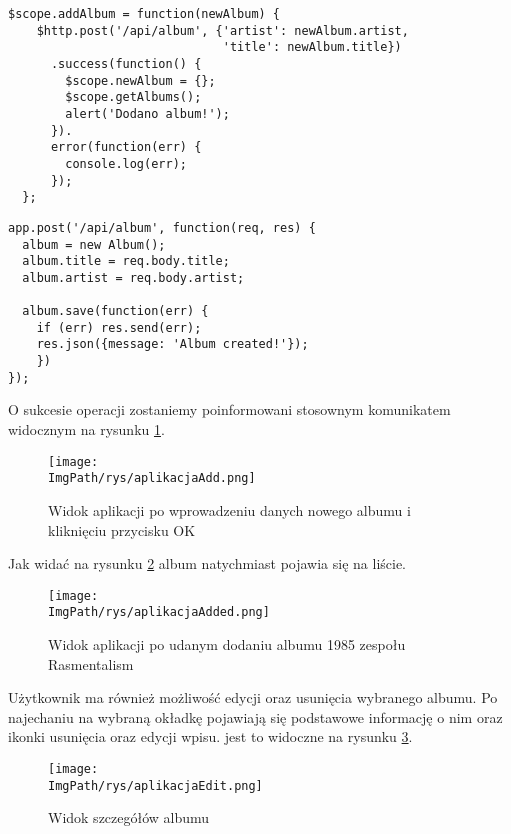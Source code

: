 \documentclass[a4paper,12pt,twoside,openany]{report}
\newcommand{\ImgPath}{.}
\begin{document}
\begin{lstlisting}[caption=Kod odpowiedzialny za wysłanie zapytania do serwera z prośbą o dodanie albumu, label=add1]
  $scope.addAlbum = function(newAlbum) {
    $http.post('/api/album', {'artist': newAlbum.artist,
                              'title': newAlbum.title})
      .success(function() {
        $scope.newAlbum = {};
        $scope.getAlbums();
        alert('Dodano album!');
      }).
      error(function(err) {
        console.log(err);
      });
  };
\end{lstlisting}


\begin{lstlisting}[caption=Kod odpowiedzialny za dodanie albumu do bazy, label=add2]
app.post('/api/album', function(req, res) {
  album = new Album();
  album.title = req.body.title;
  album.artist = req.body.artist;

  album.save(function(err) {
    if (err) res.send(err);
    res.json({message: 'Album created!'});
    })
});
\end{lstlisting}

O sukcesie operacji zostaniemy poinformowani stosownym komunikatem widocznym na rysunku \ref{aplikacjaAdd}.

\begin{figure}[!htbp]
	\begin{center}
\centering
\texttt{[image: \\ImgPath/rys/aplikacjaAdd.png]}
\end{center}
	\caption{Widok aplikacji po wprowadzeniu danych nowego albumu i kliknięciu przycisku OK}
	\label{aplikacjaAdd}
\end{figure}

Jak widać na rysunku \ref{aplikacjaAdded} album natychmiast pojawia się na liście.

\begin{figure}[!htbp]
	\begin{center}
\centering
\texttt{[image: \\ImgPath/rys/aplikacjaAdded.png]}
\end{center}
	\caption{Widok aplikacji po udanym dodaniu albumu 1985 zespołu Rasmentalism}
	\label{aplikacjaAdded}
\end{figure}

Użytkownik ma również możliwość edycji oraz usunięcia wybranego albumu. Po najechaniu na wybraną okładkę pojawiają się podstawowe informację o nim oraz ikonki usunięcia oraz edycji wpisu. jest to widoczne na rysunku \ref{aplikacjaEdit}.

\begin{figure}[!htbp]
	\begin{center}
\centering
\texttt{[image: \\ImgPath/rys/aplikacjaEdit.png]}
\end{center}
	\caption{Widok szczegółów albumu}
	\label{aplikacjaEdit}
\end{figure}
\end{document}
